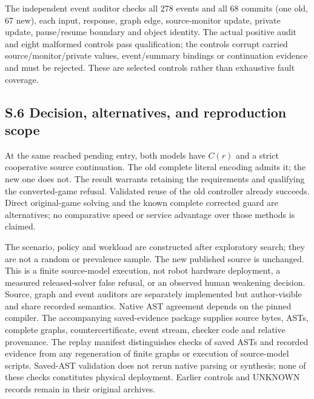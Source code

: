 The independent event auditor checks all 278 events and all 68 commits
(one old, 67 new), each input, response, graph edge, source-monitor update,
private update, pause/resume boundary and object identity. The actual
positive audit and eight malformed controls pass qualification; the
controls corrupt carried source/monitor/private values, event/summary
bindings or continuation evidence and must be rejected. These are selected
controls rather than exhaustive fault coverage.

\subsection*{S.6 Decision, alternatives, and reproduction scope}
At the same reached pending entry, both models have $C(r)$ and a strict
cooperative source continuation. The old complete literal encoding admits
it; the new one does not. The result warrants retaining the requirements
and qualifying the converted-game refusal. Validated reuse of the old
controller already succeeds. Direct original-game solving and the known
complete corrected guard are alternatives; no comparative speed or
service advantage over those methods is claimed.

The scenario, policy and workload are constructed after exploratory
search; they are not a random or prevalence sample. The new published
source is unchanged. This is a finite source-model execution, not robot
hardware deployment, a measured released-solver false refusal, or an
observed human weakening decision. Source, graph and event auditors are
separately implemented but author-visible and share recorded semantics.
Native AST agreement depends on the pinned compiler. The accompanying
saved-evidence package supplies source bytes, ASTs, complete graphs,
countercertificate, event stream, checker code and relative provenance.
The replay manifest distinguishes checks of saved ASTs and recorded
evidence from any regeneration of finite graphs or execution of source-model
scripts. Saved-AST validation does not rerun native parsing or synthesis;
none of these checks constitutes physical deployment. Earlier controls and UNKNOWN records
remain in their original archives.
